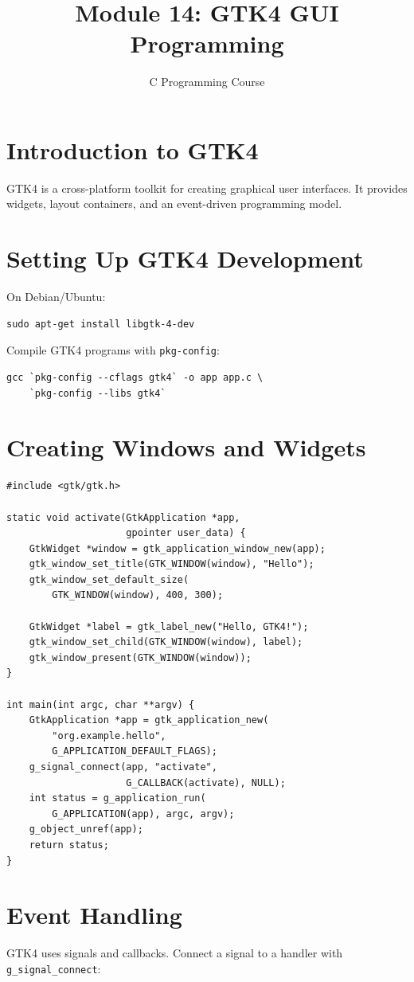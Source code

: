 \documentclass[11pt,a4paper]{article}
\title{Module 14: GTK4 GUI Programming}
\author{C Programming Course}
\date{}
\begin{document}
\maketitle
\thispagestyle{fancy}

\section{Introduction to GTK4}
GTK4 is a cross-platform toolkit for creating graphical user interfaces. It
provides widgets, layout containers, and an event-driven programming model.

\section{Setting Up GTK4 Development}
On Debian/Ubuntu:
\begin{verbatim}
sudo apt-get install libgtk-4-dev
\end{verbatim}

Compile GTK4 programs with \texttt{pkg-config}:
\begin{verbatim}
gcc `pkg-config --cflags gtk4` -o app app.c \
    `pkg-config --libs gtk4`
\end{verbatim}

\section{Creating Windows and Widgets}
\begin{lstlisting}
#include <gtk/gtk.h>

static void activate(GtkApplication *app,
                     gpointer user_data) {
    GtkWidget *window = gtk_application_window_new(app);
    gtk_window_set_title(GTK_WINDOW(window), "Hello");
    gtk_window_set_default_size(
        GTK_WINDOW(window), 400, 300);

    GtkWidget *label = gtk_label_new("Hello, GTK4!");
    gtk_window_set_child(GTK_WINDOW(window), label);
    gtk_window_present(GTK_WINDOW(window));
}

int main(int argc, char **argv) {
    GtkApplication *app = gtk_application_new(
        "org.example.hello",
        G_APPLICATION_DEFAULT_FLAGS);
    g_signal_connect(app, "activate",
                     G_CALLBACK(activate), NULL);
    int status = g_application_run(
        G_APPLICATION(app), argc, argv);
    g_object_unref(app);
    return status;
}
\end{lstlisting}

\section{Event Handling}
GTK4 uses signals and callbacks. Connect a signal to a handler with
\texttt{g\_signal\_connect}:
\end{document}
